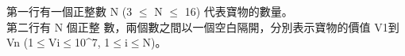 第一行有一個正整數 N (3 $\leq$ N $\leq$ 16) 代表寶物的數量。\\
第二行有 N 個正整 數，兩個數之間以一個空白隔開，分別表示寶物的價值 V1到 Vn (1$\leq$Vi$\leq$10^7, 1$\leq$i$\leq$N)。\\

